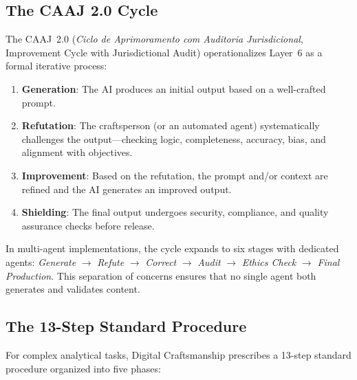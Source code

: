 \documentclass[11pt,a4paper]{article}
\begin{document}
\subsection{The CAAJ 2.0 Cycle}
\label{subsec:caaj}

The CAAJ~2.0 (\emph{Ciclo de Aprimoramento com Auditoria Jurisdicional}, Improvement Cycle with Jurisdictional Audit) operationalizes Layer~6 as a formal iterative process:

\begin{enumerate}
    \item \textbf{Generation}: The AI produces an initial output based on a well-crafted prompt.
    \item \textbf{Refutation}: The craftsperson (or an automated agent) systematically challenges the output---checking logic, completeness, accuracy, bias, and alignment with objectives.
    \item \textbf{Improvement}: Based on the refutation, the prompt and/or context are refined and the AI generates an improved output.
    \item \textbf{Shielding}: The final output undergoes security, compliance, and quality assurance checks before release.
\end{enumerate}

In multi-agent implementations, the cycle expands to six stages with dedicated agents: \emph{Generate} $\rightarrow$ \emph{Refute} $\rightarrow$ \emph{Correct} $\rightarrow$ \emph{Audit} $\rightarrow$ \emph{Ethics Check} $\rightarrow$ \emph{Final Production}. This separation of concerns ensures that no single agent both generates and validates content.

\subsection{The 13-Step Standard Procedure}

For complex analytical tasks, Digital Craftsmanship prescribes a 13-step standard procedure organized into five phases:
\end{document}
